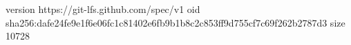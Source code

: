 version https://git-lfs.github.com/spec/v1
oid sha256:dafe24fe9e1f6e06fc1c81402e6fb9b1b8c2c853ff9d755cf7c69f262b2787d3
size 10728
